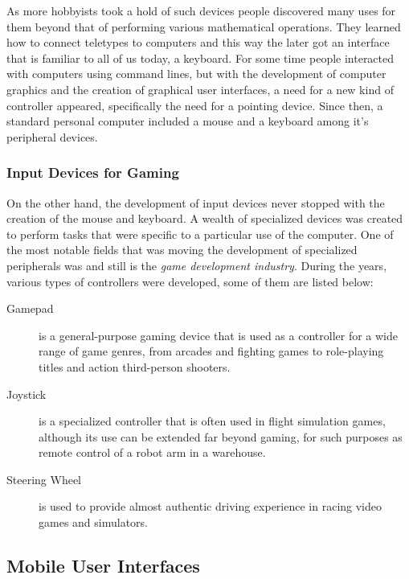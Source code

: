 
As more hobbyists took a hold of such devices people discovered many uses for them beyond that of performing various mathematical operations. They learned how to connect teletypes to computers and this way the later got an interface that is familiar to all of us today, a keyboard. For some time people interacted with computers using command lines, but with the development of computer graphics and the creation of graphical user interfaces, a need for a new kind of controller appeared, specifically the need for a pointing device. Since then, a standard personal computer included a mouse and a keyboard among it's peripheral devices.

\subsubsection{Input Devices for Gaming}

On the other hand, the development of input devices never stopped with the creation of the mouse and keyboard. A wealth of specialized devices was created to perform tasks that were specific to a particular use of the computer. One of the most notable fields that was moving the development of specialized peripherals was and still is the \emph{game development industry}. During the years, various types of controllers were developed, some of them are listed below:

\begin{description}
	\item [Gamepad] is a general-purpose gaming device that is used as a controller for a wide range of game genres, from arcades and fighting games to role-playing titles and action third-person shooters.
	\item [Joystick] is a specialized controller that is often used in flight simulation games, although its use can be extended far beyond gaming, for such purposes as remote control of a robot arm in a warehouse.
	\item [Steering Wheel] is used to provide almost authentic driving experience in racing video games and simulators.
\end{description}



\subsection{Mobile User Interfaces}

